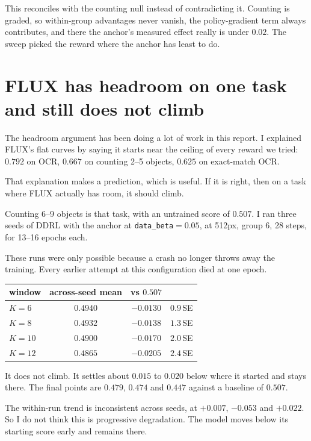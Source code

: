 \documentclass[11pt]{article}
\newcommand{\code}[1]{\texttt{\small #1}}
\begin{document}
This reconciles with the counting null instead of contradicting it. Counting is graded, so within-group advantages never vanish, the policy-gradient term always contributes, and there the anchor's measured effect really is under $0.02$. The sweep picked the reward where the anchor has least to do.

\section{FLUX has headroom on one task and still does not climb}

The headroom argument has been doing a lot of work in this report. I explained FLUX's flat curves by saying it starts near the ceiling of every reward we tried: $0.792$ on OCR, $0.667$ on counting 2--5 objects, $0.625$ on exact-match OCR.

That explanation makes a prediction, which is useful. If it is right, then on a task where FLUX actually has room, it should climb.

Counting 6--9 objects is that task, with an untrained score of $0.507$. I ran three seeds of DDRL with the anchor at \code{data\_beta}$=0.05$, at 512px, group 6, 28 steps, for 13--16 epochs each.

These runs were only possible because a crash no longer throws away the training. Every earlier attempt at this configuration died at one epoch.

\begin{center}
\begin{tabular}{lccc}
\toprule
window & across-seed mean & vs $0.507$ & \\
\midrule
$K{=}6$ & $0.4940$ & $-0.0130$ & $0.9$\,SE \\
$K{=}8$ & $0.4932$ & $-0.0138$ & $1.3$\,SE \\
$K{=}10$ & $0.4900$ & $-0.0170$ & $2.0$\,SE \\
$K{=}12$ & $0.4865$ & $-0.0205$ & $2.4$\,SE \\
\bottomrule
\end{tabular}
\end{center}

\noindent It does not climb. It settles about $0.015$ to $0.020$ below where it started and stays there. The final points are $0.479$, $0.474$ and $0.447$ against a baseline of $0.507$.

The within-run trend is inconsistent across seeds, at $+0.007$, $-0.053$ and $+0.022$. So I do not think this is progressive degradation. The model moves below its starting score early and remains there.
\end{document}
